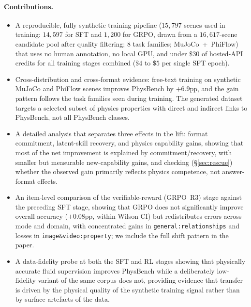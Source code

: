 \documentclass{article}
\begin{document}
\paragraph{Contributions.}
\begin{itemize}\itemsep0.05em
  \item A reproducible, fully synthetic training pipeline
        ($15{,}797$ scenes used in training: $14{,}597$ for SFT and
        $1{,}200$ for GRPO, drawn from a $16{,}617$-scene candidate
        pool after quality filtering; $8$ task families;
        MuJoCo~+~PhiFlow) that uses no human annotation, no
        local GPU, and under $\$30$ of hosted-API credits for all
        training stages combined ($\$4$ to $\$5$ per single SFT
        epoch).
  \item Cross-distribution and cross-format evidence: free-text
        training on synthetic MuJoCo and PhiFlow scenes improves
        PhysBench by $+6.9$pp, and the gain pattern follows the task
        families seen during training. The generated dataset targets a
        selected subset of physics properties with direct and indirect
        links to PhysBench, not all PhysBench classes.
  \item A detailed analysis that separates three effects in the lift:
        format commitment, latent-skill recovery, and physics
        capability gains, showing that most of the net improvement is
        explained by commitment/recovery, with smaller but measurable
        new-capability gains,
        and checking (\S\ref{sec:rescue}) whether the observed gain
        primarily reflects physics competence, not answer-format
        effects.
  \item An item-level comparison of the verifiable-reward (GRPO~R3)
        stage against the preceding SFT stage, showing that GRPO does
        not significantly improve overall accuracy ($+0.08$pp,
        within Wilson CI) but redistributes errors across mode and
        domain, with concentrated gains in
        \texttt{general:relationships} and losses in
        \texttt{image\&video:property}; we include the full shift
        pattern in the paper.
  \item A data-fidelity probe at both the SFT and RL stages showing
        that physically accurate fluid supervision improves PhysBench
        while a deliberately low-fidelity variant of the same corpus
        does not, providing evidence that transfer is driven by the
        physical quality of the synthetic training signal rather than
        by surface artefacts of the data.
\end{itemize}
\end{document}
